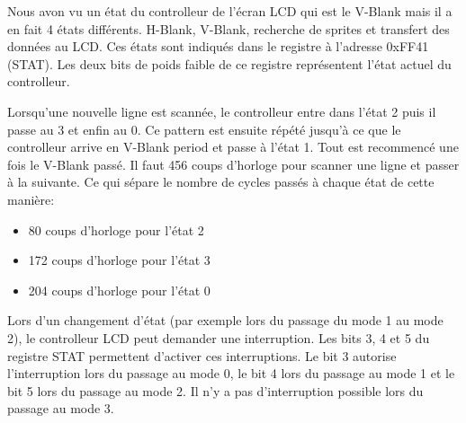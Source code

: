 \documentclass[a4paper]{article}
\begin{document}
Nous avon vu un état du controlleur de l'écran LCD qui est le V-Blank mais il a 
en fait 4 états différents.  H-Blank, V-Blank, recherche de sprites et transfert
des données au LCD. Ces états sont indiqués dans le registre à l'adresse 0xFF41
(STAT). Les deux bits de poids faible de ce registre représentent l'état actuel
du controlleur.
\begin{center}
\end{center} \bigbreak

Lorsqu'une nouvelle ligne est scannée, le controlleur entre dans l'état 2 puis il
passe au 3 et enfin au 0. Ce pattern est ensuite répété jusqu'à ce que le controlleur
arrive en V-Blank period et passe à l'état 1. Tout est recommencé une fois le V-Blank
passé. Il faut 456 coups d'horloge pour scanner une ligne et passer à la suivante.
Ce qui sépare le nombre de cycles passés à chaque état de cette manière:
\begin{itemize}[label=\textbullet]
	\item 80 coups d'horloge pour l'état 2
	\item 172 coups d'horloge pour l'état 3
	\item 204 coups d'horloge pour l'état 0
\end{itemize} \bigbreak

Lors d'un changement d'état (par exemple lors du passage du mode 1 au mode 2),
le controlleur LCD peut demander une interruption. Les bits 3, 4 et 5 du registre
STAT permettent d'activer ces interruptions. Le bit 3 autorise l'interruption lors
du passage au mode 0, le bit 4 lors du passage au mode 1 et le bit 5 lors du passage
au mode 2. Il n'y a pas d'interruption possible lors du passage au mode 3. \\
\end{document}
